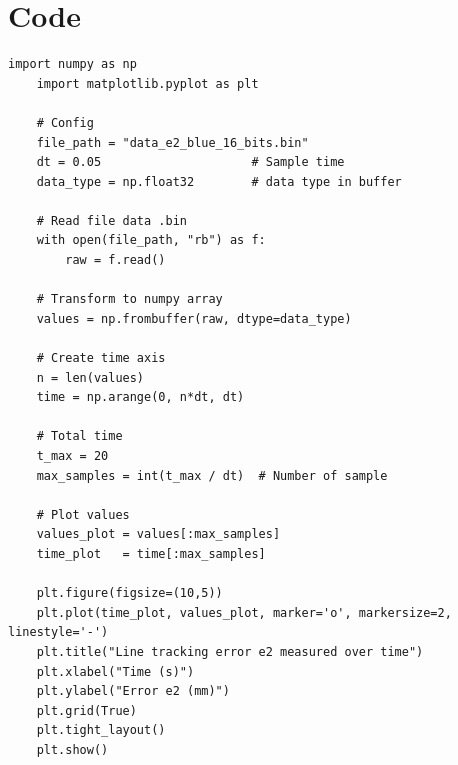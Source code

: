     \section{Code}
    \begin{lstlisting}[caption={Đọc file nhị phân và plot sai số e2}, label={lst:e2_plot}]
    import numpy as np
    import matplotlib.pyplot as plt

    # Config
    file_path = "data_e2_blue_16_bits.bin" 
    dt = 0.05                     # Sample time
    data_type = np.float32        # data type in buffer

    # Read file data .bin
    with open(file_path, "rb") as f:
        raw = f.read()

    # Transform to numpy array
    values = np.frombuffer(raw, dtype=data_type)

    # Create time axis
    n = len(values)
    time = np.arange(0, n*dt, dt)

    # Total time
    t_max = 20
    max_samples = int(t_max / dt)  # Number of sample

    # Plot values
    values_plot = values[:max_samples]
    time_plot   = time[:max_samples]

    plt.figure(figsize=(10,5))
    plt.plot(time_plot, values_plot, marker='o', markersize=2, linestyle='-')
    plt.title("Line tracking error e2 measured over time")
    plt.xlabel("Time (s)")
    plt.ylabel("Error e2 (mm)")
    plt.grid(True)
    plt.tight_layout()
    plt.show()
    \end{lstlisting}

        
